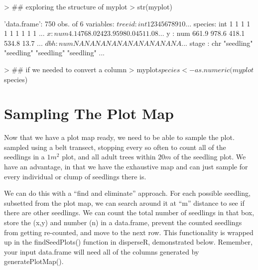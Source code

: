 \documentclass{report}
\begin{document}
\begin{Schunk}
\begin{Sinput}
> ## exploring the structure of myplot
> str(myplot)
\end{Sinput}
\begin{Soutput}
'data.frame':	750 obs. of  6 variables:
 $ treeid : int  1 2 3 4 5 6 7 8 9 10 ...
 $ species: int  1 1 1 1 1 1 1 1 1 1 ...
 $ x      : num  4.14 768.02 423.95 980.04 511.08 ...
 $ y      : num  661.9 978.6 418.1 534.8 13.7 ...
 $ dbh    : num  NA NA NA NA NA NA NA NA NA NA ...
 $ stage  : chr  "seedling" "seedling" "seedling" "seedling" ...
\end{Soutput}
\begin{Sinput}
> ## if we needed to convert a column
> myplot$species <- as.numeric(myplot$species)
\end{Sinput}
\end{Schunk}

\section{Sampling The Plot Map}

Now that we have a plot map ready, we need to be able to sample the plot.  \citet{Ribbens1994} sampled using a belt transect, stopping every so often to count all of the seedlings in a $1 m^2$ plot, and all adult trees within $20m$ of the seedling plot. We have an advantage, in that we have the exhaustive map and can just sample for every individual or clump of seedlings there is.

We can do this with a ``find and eliminate'' approach. For each possible seedling, subsetted from the plot map, we can search around it at ``m'' distance to see if there are other seedlings. We can count the total number of seedlings in that box, store the (x,y) and number (n) in a data.frame, prevent the counted seedlings from getting re-counted, and move to the next row. This functionality is wrapped up in the findSeedPlots() function in disperseR, demonstrated below. Remember, your input data.frame will need all of the columns generated by generatePlotMap().
\end{document}
